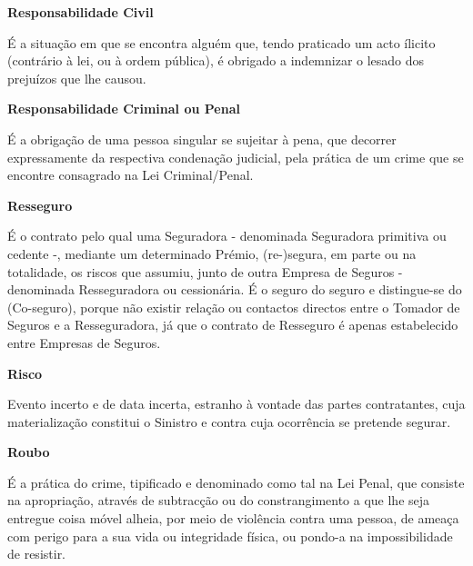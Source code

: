 \begin{description}
\item \textbf{Responsabilidade Civil}

É a situação em que se encontra alguém  que, tendo praticado um acto ílicito (contrário à lei, ou à ordem pública), é obrigado a indemnizar o lesado dos prejuízos que lhe causou.
\end{description}

\begin{description}
\item \textbf{Responsabilidade Criminal ou Penal}

É a obrigação de uma pessoa singular se sujeitar à pena, que decorrer expressamente da respectiva condenação judicial, pela prática de um crime que se encontre consagrado na Lei Criminal/Penal.
\end{description}

\begin{description}
\item \textbf{Resseguro}

É o contrato pelo qual uma Seguradora - denominada Seguradora primitiva ou cedente -, mediante um determinado Prémio, (re-)segura, em parte ou na totalidade, os riscos que assumiu, junto de outra Empresa de Seguros - denominada Resseguradora ou cessionária. É o seguro do seguro e distingue-se do (Co-seguro), porque não existir relação ou contactos directos entre o Tomador de Seguros e a Resseguradora, já que o contrato de Resseguro é apenas estabelecido entre Empresas de Seguros.
\end{description}

\begin{description}
\item \textbf{Risco}

Evento incerto e de data incerta, estranho à vontade das partes contratantes, cuja materialização constitui o Sinistro e contra cuja ocorrência se pretende segurar.
\end{description}

\begin{description}
\item \textbf{Roubo}

É a prática do crime, tipificado e denominado como tal na Lei Penal, que consiste na apropriação, através de subtracção ou do constrangimento a que lhe seja entregue coisa móvel alheia, por meio de violência contra uma pessoa, de ameaça com perigo para a sua vida ou integridade física, ou pondo-a na impossibilidade de resistir.
\end{description}

